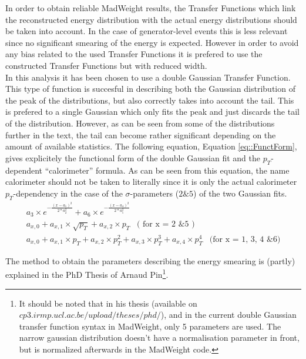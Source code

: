
In order to obtain reliable MadWeight results, the Transfer Functions which link the reconstructed energy distribution with the actual energy distributions should be taken into account. In the case of generator-level events this is less relevant since no significant smearing of the energy is expected. However in order to avoid any bias related to the used Transfer Functions it is prefered to use the constructed Transfer Functions but with reduced width.\\

In this analysis it has been chosen to use a double Gaussian Transfer Function. This type of function is succesful in describing both the Gaussian distribution of the peak of the distributions, but also correctly takes into account the tail. This is prefered to a single Gaussian which only fits the peak and just discards the tail of the distribution. However, as can be seen from some of the distributions further in the text, the tail can become rather significant depending on the amount of available statistics.
The following equation, Equation \ref{eq::FunctForm}, gives explicitely the functional form of the double Gaussian fit and the $p_T$-dependent ``calorimeter'' formula. As can be seen from this equation, the name calorimeter should not be taken to literally since it is only the actual calorimeter $p_T$-dependency in the case of the $\sigma$-parameters ($2 \& 5$) of the two Gaussian fits.
\begin{eqnarray}
 a_3 \times e^{-\frac{(x-a_1)^2}{2*a_{2}^{2}}} + a_6 \times e^{-\frac{(x-a_4)^2}{2*a_{5}^{2}}} \\
 a_{x,0} + a_{x,1} \times \sqrt{p_T} + a_{x,2} \times p_T \;\;\;  \textrm{( for x = 2 \& 5 )} \\
 a_{x,0} + a_{x,1} \times p_T + a_{x,2} \times p_{T}^{2} + a_{x,3} \times p_{T}^{3} + a_{x,4} \times p_{T}^{4} \;\;\; \textrm{(for x = 1, 3, 4 \& 6)} \label{eq::FunctForm}
\end{eqnarray}

The method to obtain the parameters describing the energy smearing is (partly) explained in the PhD Thesis of Arnaud Pin\footnote{It should be noted that in his thesis (available on $cp3.irmp.ucl.ac.be/upload/theses/phd/$), and in the current double Gaussian transfer function syntax in MadWeight, only 5 parameters are used. The narrow gaussian distribution doesn't have a normalisation parameter in front, but is normalized afterwards in the MadWeight code.}.

